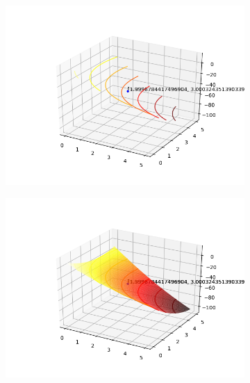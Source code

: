 \documentclass[a4paper, 12pt]{article}
\begin{document}
\begin{figure}[H]
\centering
\begin{subfigure}{0.3\textwidth}
  \centering
  \includegraphics[width=\linewidth]{5/MPFE/A/Nelder-Mead/contorno.png}
\end{subfigure}%
\begin{subfigure}{0.3\textwidth}
  \centering
  \includegraphics[width=\linewidth]{5/MPFE/A/Nelder-Mead/superficie.png}
\end{subfigure}
\begin{subfigure}{0.3\textwidth}
  \centering

\end{subfigure}
\end{figure}
\end{document}
